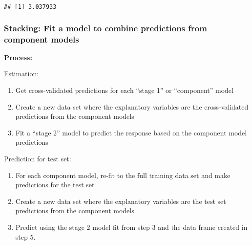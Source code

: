 \documentclass[]{article}
\newenvironment{Shaded}{\begin{snugshade}}{\end{snugshade}}
\newcommand{\DataTypeTok}[1]{\textcolor[rgb]{0.13,0.29,0.53}{#1}}
\newcommand{\DecValTok}[1]{\textcolor[rgb]{0.00,0.00,0.81}{#1}}
\newcommand{\KeywordTok}[1]{\textcolor[rgb]{0.13,0.29,0.53}{\textbf{#1}}}
\newcommand{\NormalTok}[1]{#1}
\newcommand{\OperatorTok}[1]{\textcolor[rgb]{0.81,0.36,0.00}{\textbf{#1}}}
\newcommand{\StringTok}[1]{\textcolor[rgb]{0.31,0.60,0.02}{#1}}
\providecommand{\tightlist}{%
  \setlength{\itemsep}{0pt}\setlength{\parskip}{0pt}}
\begin{document}
\begin{Shaded}
\end{Shaded}

\begin{verbatim}
## [1] 3.037933
\end{verbatim}

\hypertarget{stacking-fit-a-model-to-combine-predictions-from-component-models}{%
\subsubsection{Stacking: Fit a model to combine predictions from
component
models}\label{stacking-fit-a-model-to-combine-predictions-from-component-models}}

\textbf{Process:}

Estimation:

\begin{enumerate}
\def\labelenumi{\arabic{enumi}.}
\tightlist
\item
  Get cross-validated predictions for each ``stage 1'' or ``component''
  model
\item
  Create a new data set where the explanatory variables are the
  cross-validated predictions from the component models
\item
  Fit a ``stage 2'' model to predict the response based on the component
  model predictions
\end{enumerate}

Prediction for test set:

\begin{enumerate}
\def\labelenumi{\arabic{enumi}.}
\setcounter{enumi}{3}
\tightlist
\item
  For each component model, re-fit to the full training data set and
  make predictions for the test set
\item
  Create a new data set where the explanatory variables are the test set
  predictions from the component models
\item
  Predict using the stage 2 model fit from step 3 and the data frame
  created in step 5.
\end{enumerate}
\end{document}
